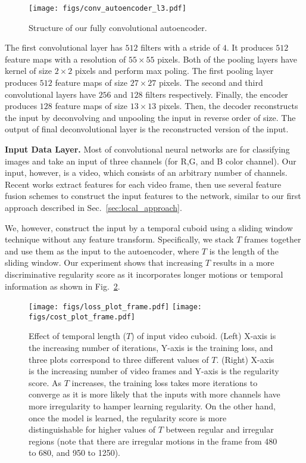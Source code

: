 \documentclass[10pt,twocolumn,letterpaper]{article}
\begin{document}
\begin{figure}[h]
	\centering
	\texttt{[image: figs/conv\_autoencoder\_l3.pdf]}
	\caption{Structure of our fully convolutional autoencoder.}
	\vspace{-2mm}
	\label{fig:conv_auto}
\end{figure}




The first convolutional layer has $512$ filters with a stride of $4$. 
It produces $512$ feature maps with a resolution of $55\times55$ pixels. 
Both of the pooling layers have kernel of size $2\times2$ pixels and perform max poling. 
The first pooling layer produces $512$ feature maps of size $27\times27$ pixels. The second and third convolutional layers have $256$ and $128$ filters respectively. 
Finally, the encoder produces $128$ feature maps of size $13 \times 13$ pixels. 
Then, the decoder reconstructs the input by deconvolving and unpooling the input in reverse order of size. 
The output of final deconvolutional layer is the reconstructed version of the input. 

\vspace{.5em}
\noindent \textbf{Input Data Layer.}
Most of convolutional neural networks are for classifying images and take an input of three channels (for R,G, and B color channel). 
Our input, however, is a video, which consists of an arbitrary number of channels.
Recent works \cite{karpathyTSLSF14,donahue2014long} extract features for each video frame, then use several feature fusion schemes to construct the input features to the network, similar to our first approach described in Sec.~\ref{sec:local_approach}.

We, however, construct the input by a temporal cuboid using a sliding window technique without any feature transform. 
Specifically, we stack $T$ frames together and use them as the input to the autoencoder, where $T$ is the length of the sliding window. 
Our experiment shows that increasing $T$ results in a more discriminative regularity score as it incorporates longer motions or temporal information as shown in Fig.~\ref{fig:trloss_n}.

\begin{figure}[h]
	\centering
	\texttt{[image: figs/loss\_plot\_frame.pdf]}
	\texttt{[image: figs/cost\_plot\_frame.pdf]}
	\caption{Effect of temporal length ($T$) of input video cuboid. (Left) X-axis is the increasing number of iterations, Y-axis is the training loss, and three plots correspond to three different values of $T$. (Right) X-axis is the increasing number of video frames and Y-axis is the regularity score. As $T$ increases, the training loss takes more iterations to converge as it is more likely that the inputs with more channels have more irregularity to hamper learning regularity. On the other hand, once the model is learned, the regularity score is more distinguishable for higher values of $T$ between regular and irregular regions (note that there are irregular motions in the frame from 480 to 680, and 950 to 1250).}
	\vspace{-4mm}
	\label{fig:trloss_n}
\end{figure}
\end{document}
